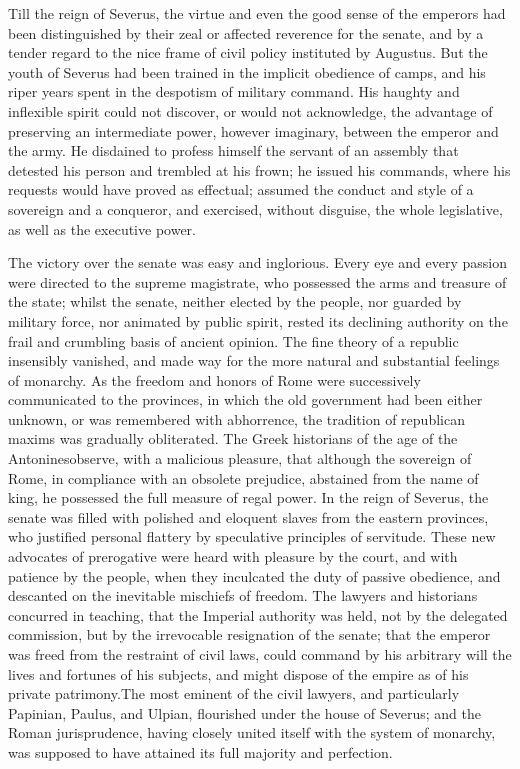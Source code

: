Till the reign of Severus, the virtue and even the good sense of
the emperors had been distinguished by their zeal or affected
reverence for the senate, and by a tender regard to the nice
frame of civil policy instituted by Augustus. But the youth of
Severus had been trained in the implicit obedience of camps, and
his riper years spent in the despotism of military command. His
haughty and inflexible spirit could not discover, or would not
acknowledge, the advantage of preserving an intermediate power,
however imaginary, between the emperor and the army. He disdained
to profess himself the servant of an assembly that detested his
person and trembled at his frown; he issued his commands, where
his requests would have proved as effectual; assumed the conduct
and style of a sovereign and a conqueror, and exercised, without
disguise, the whole legislative, as well as the executive power.

The victory over the senate was easy and inglorious. Every eye
and every passion were directed to the supreme magistrate, who
possessed the arms and treasure of the state; whilst the senate,
neither elected by the people, nor guarded by military force, nor
animated by public spirit, rested its declining authority on the
frail and crumbling basis of ancient opinion. The fine theory of
a republic insensibly vanished, and made way for the more natural
and substantial feelings of monarchy. As the freedom and honors
of Rome were successively communicated to the provinces, in which
the old government had been either unknown, or was remembered
with abhorrence, the tradition of republican maxims was gradually
obliterated. The Greek historians of the age of the Antonines\footnotemark[70]
observe, with a malicious pleasure, that although the sovereign
of Rome, in compliance with an obsolete prejudice, abstained from
the name of king, he possessed the full measure of regal power.
In the reign of Severus, the senate was filled with polished and
eloquent slaves from the eastern provinces, who justified
personal flattery by speculative principles of servitude. These
new advocates of prerogative were heard with pleasure by the
court, and with patience by the people, when they inculcated the
duty of passive obedience, and descanted on the inevitable
mischiefs of freedom. The lawyers and historians concurred in
teaching, that the Imperial authority was held, not by the
delegated commission, but by the irrevocable resignation of the
senate; that the emperor was freed from the restraint of civil
laws, could command by his arbitrary will the lives and fortunes
of his subjects, and might dispose of the empire as of his
private patrimony.\footnotemark[71] The most eminent of the civil lawyers, and
particularly Papinian, Paulus, and Ulpian, flourished under the
house of Severus; and the Roman jurisprudence, having closely
united itself with the system of monarchy, was supposed to have
attained its full majority and perfection.


